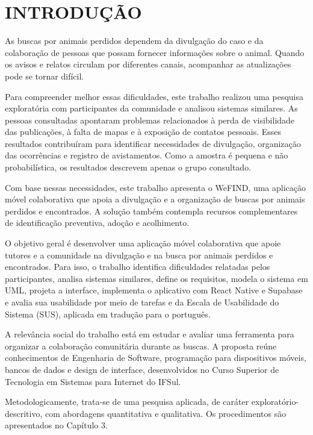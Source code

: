 \section{INTRODUÇÃO}

As buscas por animais perdidos dependem da divulgação do caso e da colaboração de pessoas que possam fornecer informações sobre o animal. Quando os avisos e relatos circulam por diferentes canais, acompanhar as atualizações pode se tornar difícil.

Para compreender melhor essas dificuldades, este trabalho realizou uma pesquisa exploratória com participantes da comunidade e analisou sistemas similares. As pessoas consultadas apontaram problemas relacionados à perda de visibilidade das publicações, à falta de mapas e à exposição de contatos pessoais. Esses resultados contribuíram para identificar necessidades de divulgação, organização das ocorrências e registro de avistamentos. Como a amostra é pequena e não probabilística, os resultados descrevem apenas o grupo consultado.

Com base nessas necessidades, este trabalho apresenta o WeFIND, uma aplicação móvel colaborativa que apoia a divulgação e a organização de buscas por animais perdidos e encontrados. A solução também contempla recursos complementares de identificação preventiva, adoção e acolhimento.

O objetivo geral é desenvolver uma aplicação móvel colaborativa que apoie tutores e a comunidade na divulgação e na busca por animais perdidos e encontrados. Para isso, o trabalho identifica dificuldades relatadas pelos participantes, analisa sistemas similares, define os requisitos, modela o sistema em UML, projeta a interface, implementa o aplicativo com React Native e Supabase e avalia sua usabilidade por meio de tarefas e da Escala de Usabilidade do Sistema (SUS), aplicada em tradução para o português.

A relevância social do trabalho está em estudar e avaliar uma ferramenta para organizar a colaboração comunitária durante as buscas. A proposta reúne conhecimentos de Engenharia de Software, programação para dispositivos móveis, bancos de dados e design de interface, desenvolvidos no Curso Superior de Tecnologia em Sistemas para Internet do IFSul.

Metodologicamente, trata-se de uma pesquisa aplicada, de caráter exploratório-descritivo, com abordagens quantitativa e qualitativa. Os procedimentos são apresentados no Capítulo 3.

